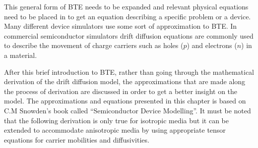 \begin{doublespace}
This general form of BTE needs to be expanded and relevant physical equations need to be placed in to get an equation describing a specific problem or a device. 
Many different device simulators use some sort of approximation to  BTE. In commercial semiconductor simulators drift diffusion equations are commonly used to describe the movement of charge carriers such as holes ($p$) and electrons ($n$) in a material\cite{Comsol}\cite{SILVACO}\cite{LumDev}. 

After this brief introduction to  BTE, rather than going through the mathematical derivation of the drift diffusion model, the approximations that are made along the process of derivation are discussed in order to get a better insight on the model. The approximations and equations presented in this chapter is based on C.M Snowden's book called ``Semiconductor Device Modelling''\cite{snowden}. It must be noted that the following derivation is only true for isotropic media but it can be extended to accommodate anisotropic media by using appropriate tensor equations for carrier mobilities and diffusivities.


\end{doublespace}
